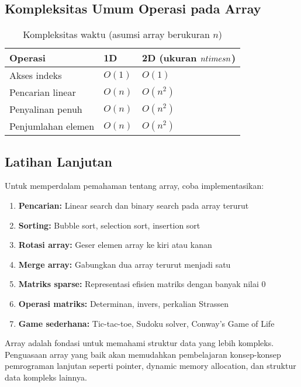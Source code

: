 \documentclass[../main.tex]{subfiles}
\begin{document}
\subsection{Kompleksitas Umum Operasi pada Array}
\begin{table}[H]
  \centering
  \caption{Kompleksitas waktu (asumsi array berukuran $n$)}
  \begin{tabular}{@{}lll@{}}
    \toprule
    Operasi & 1D & 2D (ukuran $n\\times n$) \\
    \midrule
    Akses indeks & $O(1)$ & $O(1)$ \\
    Pencarian linear & $O(n)$ & $O(n^2)$ \\
    Penyalinan penuh & $O(n)$ & $O(n^2)$ \\
    Penjumlahan elemen & $O(n)$ & $O(n^2)$ \\
    \bottomrule
  \end{tabular}
\end{table}

\subsection{Latihan Lanjutan}

Untuk memperdalam pemahaman tentang array, coba implementasikan:
\begin{enumerate}
  \item \textbf{Pencarian:} Linear search dan binary search pada array terurut
  \item \textbf{Sorting:} Bubble sort, selection sort, insertion sort
  \item \textbf{Rotasi array:} Geser elemen array ke kiri atau kanan
  \item \textbf{Merge array:} Gabungkan dua array terurut menjadi satu
  \item \textbf{Matriks sparse:} Representasi efisien matriks dengan banyak nilai 0
  \item \textbf{Operasi matriks:} Determinan, invers, perkalian Strassen
  \item \textbf{Game sederhana:} Tic-tac-toe, Sudoku solver, Conway's Game of Life
\end{enumerate}

Array adalah fondasi untuk memahami struktur data yang lebih kompleks. Penguasaan array yang baik akan memudahkan pembelajaran konsep-konsep pemrograman lanjutan seperti pointer, dynamic memory allocation, dan struktur data kompleks lainnya.
\end{document}
